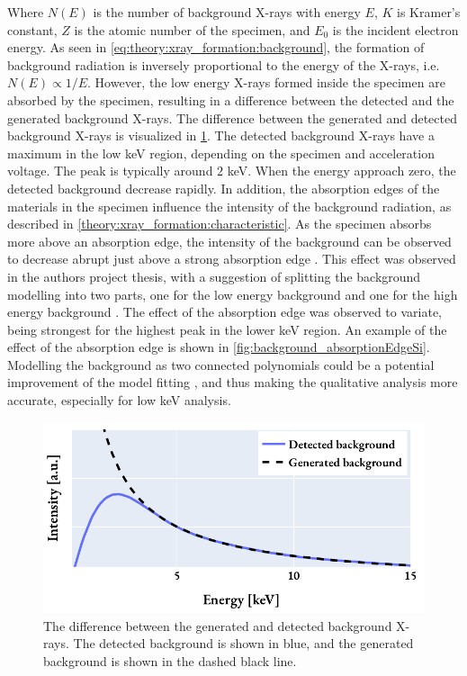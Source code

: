 Where $N(E)$ is the number of background X-rays with energy $E$, $K$ is Kramer's constant, $Z$ is the atomic number of the specimen, and $E_0$ is the incident electron energy.
As seen in \cref{eq:theory:xray_formation:background}, the formation of background radiation is inversely proportional to the energy of the X-rays, i.e. $N(E) \propto 1/E$.
However, the low energy X-rays formed inside the specimen are absorbed by the specimen, resulting in a difference between the detected and the generated background X-rays.
The difference between the generated and detected background X-rays is visualized in \cref{fig:background_xrays}.
The detected background X-rays have a maximum in the low keV region, depending on the specimen and acceleration voltage.
The peak is typically around $2$ keV.
When the energy approach zero, the detected background decrease rapidly.
In addition, the absorption edges of the materials in the specimen influence the intensity of the background radiation, as described in \cref{theory:xray_formation:characteristic}.
As the specimen absorbs more above an absorption edge, the intensity of the background can be observed to decrease abrupt just above a strong absorption edge \cite[p. 59]{goldstein_scanning_2018}.
This effect was observed in the authors project thesis, with a suggestion of splitting the background modelling into two parts, one for the low energy background and one for the high energy background \cite{project_report}.
The effect of the absorption edge was observed to variate, being strongest for the highest peak in the lower keV region.
An example of the effect of the absorption edge is shown in \cref{fig:background_absorptionEdgeSi}.
Modelling the background as two connected polynomials could be a potential improvement of the model fitting \cite{hyperspy_1.7.1,nilsen_factorless_2021}, and thus making the qualitative analysis more accurate, especially for low keV analysis.


\begin{figure}[pht]
    \centering
    \includegraphics[width=0.8\linewidth]{figures/background_generated_detected.pdf}
    \caption{
        The difference between the generated and detected background X-rays.
        The detected background is shown in blue, and the generated background is shown in the dashed black line.
    }
    \label{fig:background_xrays}
\end{figure}

